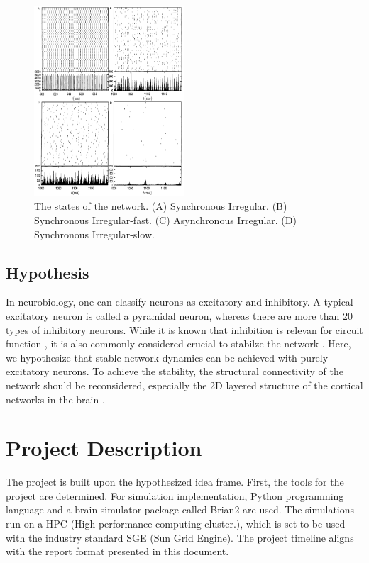 \documentclass[a4paper,12pt]{article}
\begin{document}
\begin{figure}[H]
    \centering
    \includegraphics[width = 0.5\textwidth]{brunel.png}
    \caption{The states of the network. (A) Synchronous Irregular. (B) Synchronous Irregular-fast. (C) Asynchronous Irregular. (D) Synchronous Irregular-slow.}
    \label{brunel_fig}
\end{figure} 

\subsection{Hypothesis}

In neurobiology, one can classify neurons as excitatory and inhibitory. A typical excitatory neuron is called a pyramidal neuron, whereas there are more than 20 types of inhibitory neurons. While it is known that inhibition is relevan for circuit function \cite{Isaacson2011HowIS}, it is also commonly considered crucial to stabilze the network \cite{sprekeler2017functional}. Here, we hypothesize that stable network dynamics can be achieved with purely excitatory neurons. To achieve the stability, the structural connectivity of the network should be reconsidered, especially the 2D layered structure of the cortical networks in the brain \cite{2Dstructure}. 

\section{Project Description}
The project is built upon the hypothesized idea frame. First, the tools for the project are determined. For simulation implementation, Python programming language and a brain simulator package called Brian2 \cite{brian2} are used. The simulations run on a HPC (High-performance computing cluster.), which is set to be used with the industry standard SGE (Sun Grid Engine). The project timeline aligns with the report format presented in this document. 
\end{document}
